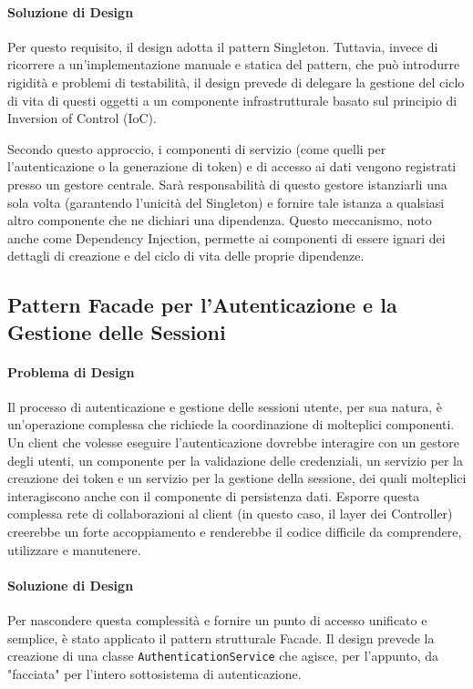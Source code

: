 \documentclass[12pt,a4paper,openright,twoside]{book}
\begin{document}
\paragraph{Soluzione di Design}
Per questo requisito, il design adotta il pattern Singleton. Tuttavia, invece di ricorrere a un'implementazione manuale e statica del pattern, che può introdurre rigidità e problemi di testabilità, il design prevede di delegare la gestione del ciclo di vita di questi oggetti a un componente infrastrutturale basato sul principio di Inversion of Control (IoC).

Secondo questo approccio, i componenti di servizio (come quelli per l'autenticazione o la generazione di token) e di accesso ai dati vengono registrati presso un gestore centrale. Sarà responsabilità di questo gestore istanziarli una sola volta (garantendo l'unicità del Singleton) e fornire tale istanza a qualsiasi altro componente che ne dichiari una dipendenza. Questo meccanismo, noto anche come Dependency Injection, permette ai componenti di essere ignari dei dettagli di creazione e del ciclo di vita delle proprie dipendenze.

\subsection{Pattern Facade per l'Autenticazione e la Gestione delle Sessioni}
\label{subsec:design_facade}

\paragraph{Problema di Design}
Il processo di autenticazione e gestione delle sessioni utente, per sua natura, è un'operazione complessa che richiede la coordinazione di molteplici componenti. Un client che volesse eseguire l'autenticazione dovrebbe interagire con un gestore degli utenti, un componente per la validazione delle credenziali, un servizio per la creazione dei token e un servizio per la gestione della sessione, dei quali molteplici interagiscono anche con il componente di persistenza dati. Esporre questa complessa rete di collaborazioni al client (in questo caso, il layer dei Controller) creerebbe un forte accoppiamento e renderebbe il codice difficile da comprendere, utilizzare e manutenere.

\paragraph{Soluzione di Design}
Per nascondere questa complessità e fornire un punto di accesso unificato e semplice, è stato applicato il pattern strutturale Facade. Il design prevede la creazione di una classe \texttt{AuthenticationService} che agisce, per l'appunto, da "facciata" per l'intero sottosistema di autenticazione.
\end{document}
